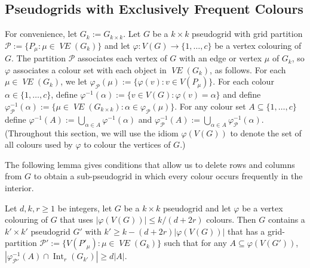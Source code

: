 \documentclass{patmorin}
\DeclareMathOperator{\interior}{Int}
\DeclareMathOperator{\VE}{\mathit{VE}}
\begin{document}
\subsection{Pseudogrids with Exclusively Frequent Colours}
\label{only_frequent_sec}

For convenience, let $G_k:=G_{k\times k}$.
Let $G$ be a $k\times k$ pseudogrid with grid partition $\mathcal{P}:=\{P_\mu:\mu\in\VE(G_{k})\}$ and let $\varphi:V(G)\to\{1,\ldots,c\}$ be a vertex colouring of $G$.  The partition $\mathcal{P}$ associates each vertex of $G$ with an edge or vertex $\mu$ of $G_k$, so $\varphi$ associates a colour set with each object in $\VE(G_k)$, as follows.  For each $\mu\in\VE(G_{k})$, we let $\varphi_{\mathcal{P}}(\mu):=\{\varphi(v):v\in V(P_\mu)\}$.  For each colour $\alpha\in\{1,\ldots,c\}$, define $\varphi^{-1}(\alpha):=\{v\in V(G):\varphi(v)=\alpha\}$ and define $\varphi_\mathcal{P}^{-1}(\alpha):=\{\mu\in \VE(G_{k\times k}):\alpha\in\varphi_\mathcal{P}(\mu)\}$.  For any colour set $A\subseteq\{1,\ldots,c\}$ define $\varphi^{-1}(A):=\bigcup_{\alpha\in A}\varphi^{-1}(\alpha)$ and $\varphi_\mathcal{P}^{-1}(A):=\bigcup_{\alpha\in A}\varphi_{\mathcal{P}}^{-1}(\alpha)$.  (Throughout this section, we will use the idiom $\varphi(V(G))$ to denote the set of all colours used by $\varphi$ to colour the vertices of $G$.)

The following lemma gives conditions that allow us to delete rows and columns from $G$ to obtain a sub-pseudogrid in which every colour occurs frequently in the interior.


\begin{lem}\label{only_frequent}
  Let $d,k,r\ge 1$ be integers, let $G$ be a $k\times k$ pseudogrid and let $\varphi$ be a vertex colouring of $G$ that uses $|\varphi(V(G))|\le k/(d+2r)$ colours.
  Then $G$ contains a $k'\times k'$ pseudogrid $G'$ with $k'\ge k - (d+2r)|\varphi(V(G))|$ that has a grid-partition $\mathcal{P}':=\{V(P'_\mu):\mu\in \VE(G_{k})\}$ such that
  for any $A\subseteq \varphi(V(G'))$, $|\varphi_{\mathcal{P}'}^{-1}(A)\cap \interior_r(G_{k'})| \ge d|A|$.
\end{lem}
\end{document}
